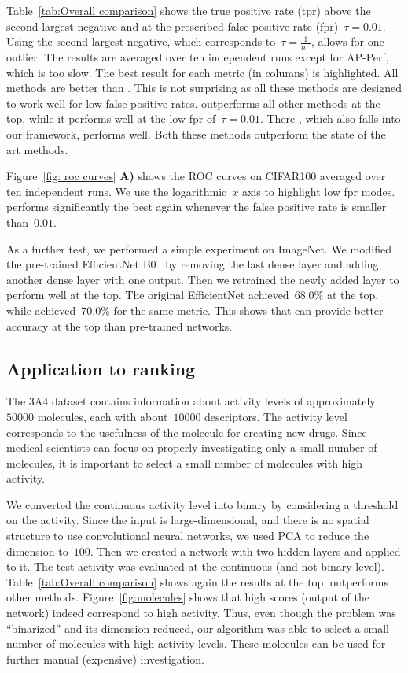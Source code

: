 Table~\ref{tab:Overall comparison} shows the true positive rate (tpr) above the second-largest negative and at the prescribed false positive rate (fpr)~$\tau=0.01$. Using the second-largest negative, which corresponds to~$\tau=\frac{1}{n^-}$, allows for one outlier. The results are averaged over ten independent runs except for AP-Perf, which is too slow. The best result for each metric (in columns) is highlighted. All methods are better than \BaseLine. This is not surprising as all these methods are designed to work well for low false positive rates. \DeepTopPush outperforms all other methods at the top, while it performs well at the low fpr of~$\tau=0.01$. There \PatMatNP, which also falls into our framework, performs well. Both these methods outperform the state of the art methods. 

Figure~\ref{fig: roc curves} \textbf{A)} shows the ROC curves on CIFAR100 averaged over ten independent runs. We use the logarithmic~$x$ axis to highlight low fpr modes. \DeepTopPush performs significantly the best again whenever the false positive rate is smaller than~$0.01$.

As a further test, we performed a simple experiment on ImageNet. We modified the pre-trained EfficientNet B0~\cite{tan2019efficientnet} by removing the last dense layer and adding another dense layer with one output. Then we retrained the newly added layer to perform well at the top. The original EfficientNet achieved~$68.0\%$ at the top, while \DeepTopPush achieved~$70.0\%$ for the same metric. This shows that \DeepTopPush can provide better accuracy at the top than pre-trained networks.

\subsection{Application to ranking}

The 3A4 dataset contains information about activity levels of approximately~$50000$ molecules, each with about~$10000$ descriptors. The activity level corresponds to the usefulness of the molecule for creating new drugs. Since medical scientists can focus on properly investigating only a small number of molecules, it is important to select a small number of molecules with high activity.

We converted the continuous activity level into binary by considering a threshold on the activity. Since the input is large-dimensional, and there is no spatial structure to use convolutional neural networks, we used PCA to reduce the dimension to~$100$. Then we created a network with two hidden layers and applied \DeepTopPush to it. The test activity was evaluated at the continuous (and not binary level). Table~\ref{tab:Overall comparison} shows again the results at the top. \DeepTopPush outperforms other methods. Figure~\ref{fig:molecules} shows that high scores (output of the network) indeed correspond to high activity. Thus, even though the problem was ``binarized'' and its dimension reduced, our algorithm was able to select a small number of molecules with high activity levels. These molecules can be used for further manual (expensive) investigation.

